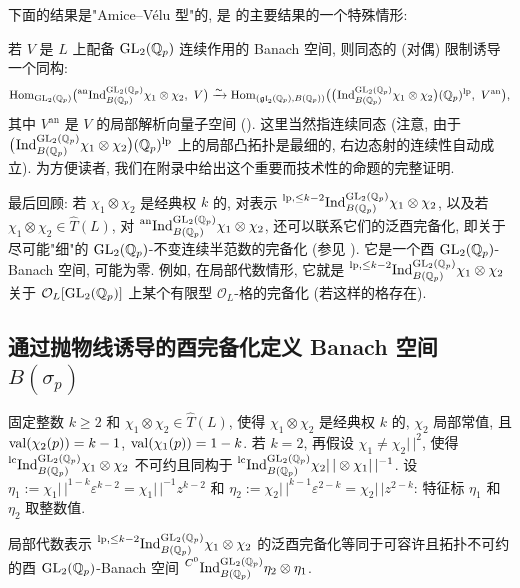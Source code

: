 下面的结果是"Amice--V\'elu 型"的, 是 \cite{ref:23} 的主要结果的一个特殊情形:

\begin{proposition}\label{prop:2.1.4}
若 $V$ 是 $L$ 上配备 $\mathrm{GL}_2(\mathbb{Q}_p)$ 连续作用的 Banach 空间, 则同态的 (对偶) 限制诱导一个同构:
\[
\Hom_{\GL_2(\Qp)}\bigl(\anind_{B(\Qp)}^{\GL_2(\Qp)} \chi_1 \otimes \chi_2,\ V\bigr)
\xrightarrow{\sim}
\Hom_{(\mathfrak{gl}_2(\Qp),B(\Qp))}\bigl(\bigl(\pind{}_{B(\Qp)}^{\GL_2(\Qp)} \chi_1 \otimes \chi_2\bigr)(\Qp)^{\mathrm{lp}},\ V^{\mathrm{an}}\bigr),
\]
其中 $V^{\mathrm{an}}$ 是 $V$ 的局部解析向量子空间 (\cite[\S7]{ref:45}).
这里当然指连续同态 (注意, 由于 $\bigl(\prescript{}{}{\mathrm{Ind}}_{B(\mathbb{Q}_p)}^{\mathrm{GL}_2(\mathbb{Q}_p)} \chi_1 \otimes \chi_2\bigr)(\mathbb{Q}_p)^{\mathrm{lp}}$ 上的局部凸拓扑是最细的, 右边态射的连续性自动成立).
为方便读者, 我们在附录中给出这个重要而技术性的命题的完整证明.
\end{proposition}

最后回顾: 若 $\chi_1 \otimes \chi_2$ 是经典权 $k$ 的, 对表示 $\prescript{\mathrm{lp},\le k-2}{}{\mathrm{Ind}}_{B(\mathbb{Q}_p)}^{\mathrm{GL}_2(\mathbb{Q}_p)} \chi_1 \otimes \chi_2$, 以及若 $\chi_1 \otimes \chi_2 \in \widehat{T}(L)$, 对 $\prescript{\mathrm{an}}{}{\mathrm{Ind}}_{B(\mathbb{Q}_p)}^{\mathrm{GL}_2(\mathbb{Q}_p)} \chi_1 \otimes \chi_2$, 还可以联系它们的泛酉完备化, 即关于尽可能"细"的 $\mathrm{GL}_2(\mathbb{Q}_p)$-不变连续半范数的完备化 (参见 \cite[\S1]{ref:21}).
它是一个酉 $\mathrm{GL}_2(\mathbb{Q}_p)$-Banach 空间, 可能为零.
例如, 在局部代数情形, 它就是 $\prescript{\mathrm{lp},\le k-2}{}{\mathrm{Ind}}_{B(\mathbb{Q}_p)}^{\mathrm{GL}_2(\mathbb{Q}_p)} \chi_1 \otimes \chi_2$ 关于 $\mathcal{O}_L[\mathrm{GL}_2(\mathbb{Q}_p)]$ 上某个有限型 $\mathcal{O}_L$-格的完备化 (若这样的格存在).

\subsection{通过抛物线诱导的酉完备化定义 Banach 空间 $B(\sigma_p)$}\label{sec:2.2}

固定整数 $k \ge 2$ 和 $\chi_1 \otimes \chi_2 \in \widehat{T}(L)$, 使得 $\chi_1 \otimes \chi_2$ 是经典权 $k$ 的, $\chi_2$ 局部常值, 且 $\operatorname{val}(\chi_2(p)) = k-1$, $\operatorname{val}(\chi_1(p)) = 1-k$.
若 $k = 2$, 再假设 $\chi_1 \neq \chi_2|\,|^{2}$, 使得 $\prescript{\mathrm{lc}}{}{\mathrm{Ind}}_{B(\mathbb{Q}_p)}^{\mathrm{GL}_2(\mathbb{Q}_p)} \chi_1 \otimes \chi_2$ 不可约且同构于 $\prescript{\mathrm{lc}}{}{\mathrm{Ind}}_{B(\mathbb{Q}_p)}^{\mathrm{GL}_2(\mathbb{Q}_p)} \chi_2|\,| \otimes \chi_1|\,|^{-1}$.
设 $\eta_1 := \chi_1|\,|^{1-k}\varepsilon^{k-2} = \chi_1|\,|^{-1}z^{k-2}$ 和 $\eta_2 := \chi_2|\,|^{k-1}\varepsilon^{2-k} = \chi_2|\,|z^{2-k}$: 特征标 $\eta_1$ 和 $\eta_2$ 取整数值.

\begin{proposition}\label{prop:2.2.1}
局部代数表示 $\prescript{\mathrm{lp},\le k-2}{}{\mathrm{Ind}}_{B(\mathbb{Q}_p)}^{\mathrm{GL}_2(\mathbb{Q}_p)} \chi_1 \otimes \chi_2$ 的泛酉完备化等同于可容许且拓扑不可约的酉 $\mathrm{GL}_2(\mathbb{Q}_p)$-Banach 空间 $\prescript{C^{0}}{}{\mathrm{Ind}}_{B(\mathbb{Q}_p)}^{\mathrm{GL}_2(\mathbb{Q}_p)} \eta_2 \otimes \eta_1$.
\end{proposition}

